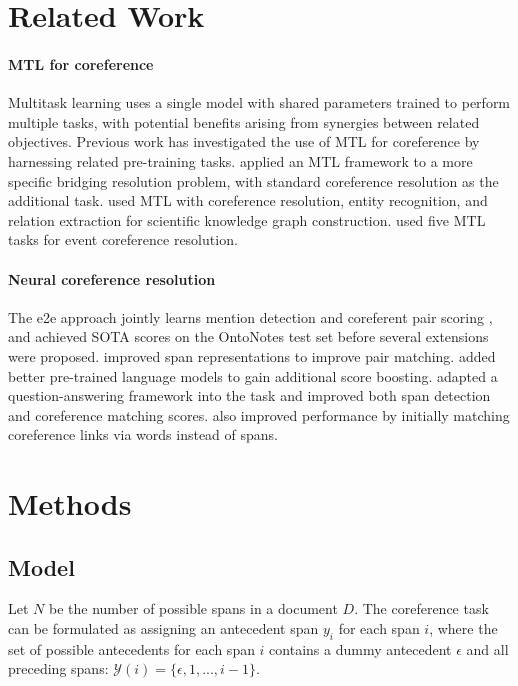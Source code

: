\documentclass[11pt]{article}
\begin{document}
\section{Related Work} \label{sec:literature}
\paragraph{MTL for coreference}
Multitask learning \cite{Caruana1997,CollobertWeston2008} uses a single model with shared parameters trained to perform multiple tasks, with potential benefits arising from synergies between related objectives.
Previous work has investigated the use of MTL for coreference by harnessing related pre-training tasks. 
\citet{yu-poesio-2020-multitask, kobayashi-etal-2022-constrained} applied an MTL framework to a more specific bridging resolution problem, with standard coreference resolution as the additional task. \citet{luan-etal-2018-multi} used MTL with coreference resolution, entity recognition, and relation extraction for scientific knowledge graph construction. \citet{lu-ng-2021-constrained} used five MTL tasks for event coreference resolution. 


\paragraph{Neural coreference resolution}
The e2e approach jointly learns mention detection and coreferent pair scoring \citep{lee-etal-2017-end}, and achieved SOTA scores on the OntoNotes test set before several extensions were proposed. \citet{lee-etal-2018-higher, kantor-globerson-2019-coreference} improved span representations to improve pair matching. 
\citet{joshi-etal-2020-spanbert} added better pre-trained language models to gain additional score boosting. \citet{wu-etal-2020-corefqa} adapted a question-answering framework into the task and improved both span detection and coreference matching scores. \citet{dobrovolskii-2021-word} also improved performance by initially matching coreference links via words instead of spans.

\section{Methods} \label{sec:model}
\subsection{Model}
Let $N$ be the number of possible spans in a document $D$. The coreference task can be formulated as assigning an antecedent span $y_i$ for each span $i$, where the set of possible antecedents for each span $i$ contains a dummy antecedent $\epsilon$ and all preceding spans: $\mathcal{Y}(i) = \{\epsilon, 1,...,i-1\}$. 
\end{document}
